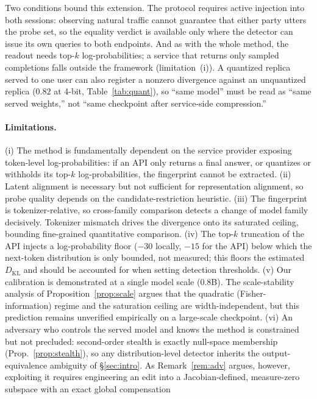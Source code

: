 \documentclass[11pt]{article}
\theoremstyle{definition}
\begin{document}
Two conditions bound this extension. The protocol requires active injection
into both sessions: observing natural traffic cannot guarantee that either
party utters the probe set, so the equality verdict is available only where the
detector can issue its own queries to both endpoints. And as with the whole
method, the readout needs top-$k$ log-probabilities; a service that returns only
sampled completions falls outside the framework (limitation~(i)). A quantized
replica served to one user can also register a nonzero divergence against an
unquantized replica ($0.82$ at 4-bit, Table~\ref{tab:quant}), so ``same model''
must be read as ``same served weights,'' not ``same checkpoint after
service-side compression.''

\paragraph{Limitations.}
(i) The method is fundamentally dependent on the service provider exposing
token-level log-probabilities: if an API only returns a final answer, or
quantizes or withholds its top-$k$ log-probabilities, the fingerprint cannot
be extracted. (ii) Latent alignment is necessary but not
sufficient for representation alignment, so probe quality depends on the
candidate-restriction heuristic. (iii) The fingerprint
is tokenizer-relative, so cross-family comparison detects a change of model
family decisively. Tokenizer mismatch drives the
divergence onto its saturated ceiling, bounding fine-grained quantitative
comparison. (iv) The
top-$k$ truncation of the API injects a log-probability floor ($-30$ locally,
$-15$ for the API) below which the next-token distribution is only bounded,
not measured; this
floors the estimated $D_{\mathrm{KL}}$ and should be accounted for when setting
detection thresholds.
(v) Our calibration is demonstrated at a single model scale ($0.8$B). The
scale-stability analysis of Proposition~\ref{prop:scale} argues that the
quadratic (Fisher-information) regime and the saturation ceiling are
width-independent, but this prediction remains unverified empirically on a
large-scale checkpoint. (vi) An adversary who
controls the served model and knows the method is constrained but not
precluded: second-order stealth is exactly null-space membership
(Prop.~\ref{prop:stealth}), so any distribution-level detector inherits the
output-equivalence ambiguity of \S\ref{sec:intro}. As Remark~\ref{rem:adv}
argues, however, exploiting it requires engineering an edit into a
Jacobian-defined, measure-zero subspace with an exact global compensation
\end{document}
